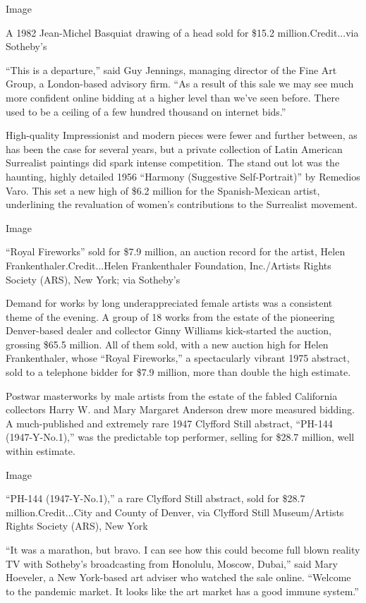 Image

A 1982 Jean-Michel Basquiat drawing of a head sold for \$15.2
million.Credit...via Sotheby's

``This is a departure,'' said Guy Jennings, managing director of the
Fine Art Group, a London-based advisory firm. ``As a result of this sale
we may see much more confident online bidding at a higher level than
we've seen before. There used to be a ceiling of a few hundred thousand
on internet bids.''

High-quality Impressionist and modern pieces were fewer and further
between, as has been the case for several years, but a private
collection of Latin American Surrealist paintings did spark intense
competition. The stand out lot was the haunting, highly detailed 1956
``Harmony (Suggestive Self-Portrait)'' by Remedios Varo. This set a new
high of \$6.2 million for the Spanish-Mexican artist, underlining the
revaluation of women's contributions to the Surrealist movement.

Image

``Royal Fireworks'' sold for \$7.9 million, an auction record for the
artist, Helen Frankenthaler.Credit...Helen Frankenthaler Foundation,
Inc./Artists Rights Society (ARS), New York; via Sotheby's

Demand for works by long underappreciated female artists was a
consistent theme of the evening. A group of 18 works from the estate of
the pioneering Denver-based dealer and collector Ginny Williams
kick-started the auction, grossing \$65.5 million. All of them sold,
with a new auction high for Helen Frankenthaler, whose ``Royal
Fireworks,'' a spectacularly vibrant 1975 abstract, sold to a telephone
bidder for \$7.9 million, more than double the high estimate.

Postwar masterworks by male artists from the estate of the fabled
California collectors Harry W. and Mary Margaret Anderson drew more
measured bidding. A much-published and extremely rare 1947 Clyfford
Still abstract, ``PH-144 (1947-Y-No.1),'' was the predictable top
performer, selling for \$28.7 million, well within estimate.

Image

``PH-144 (1947-Y-No.1),'' a rare Clyfford Still abstract, sold for
\$28.7 million.Credit...City and County of Denver, via Clyfford Still
Museum/Artists Rights Society (ARS), New York

``It was a marathon, but bravo. I can see how this could become full
blown reality TV with Sotheby's broadcasting from Honolulu, Moscow,
Dubai,'' said Mary Hoeveler, a New York-based art adviser who watched
the sale online. ``Welcome to the pandemic market. It looks like the art
market has a good immune system.''

